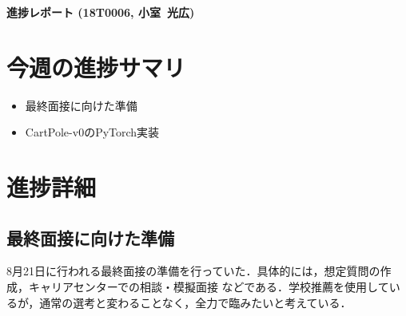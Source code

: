 \documentclass[11pt,a4paper]{jsarticle}
\def\stdid{18T0006}		%
\def\sirname{小室}		%
\def\firstname{光広}		%
\begin{document}

\noindent
\textbf{\large 進捗レポート (\stdid, \sirname\ \firstname)}		%

\section*{今週の進捗サマリ}			%

\begin{itemize}
\item 最終面接に向けた準備
\item CartPole-v0のPyTorch実装
\end{itemize}

\section{進捗詳細}					%
\subsection{最終面接に向けた準備}
8月21日に行われる最終面接の準備を行っていた．具体的には，想定質問の作成，キャリアセンターでの相談・模擬面接
などである．学校推薦を使用しているが，通常の選考と変わることなく，全力で臨みたいと考えている．
\end{document}
